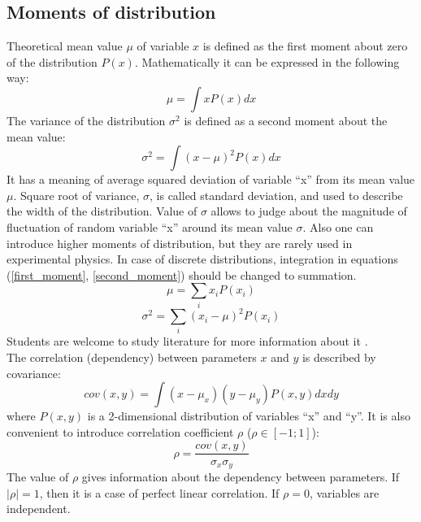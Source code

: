 \documentclass[12pt,a4paper]{report}
\begin{document}
\subsection{Moments of distribution}
Theoretical mean value $\mu$ of variable $x$ is defined as the first moment about zero of the distribution $P(x)$. Mathematically it can be expressed in the following way:
\begin{equation} \label{first_moment}
\mu = \int x P(x) dx
\end{equation}
The variance of the distribution $\sigma^2$ is defined as a second moment about the mean value:
\begin{equation} \label{second_moment}
\sigma^2 = \int (x-\mu)^2P(x)dx
\end{equation}
It has a meaning of average squared deviation of variable \enquote{x} from its mean value $\mu$. Square root of variance, $\sigma$, is called standard deviation, and used to describe the width of the distribution. Value of $\sigma$ allows to judge about the magnitude of fluctuation of random variable \enquote{x} around its mean value $\sigma$. Also one can introduce higher moments of distribution, but they are rarely used in experimental physics. In case of discrete distributions, integration in equations (\ref{first_moment}, \ref{second_moment}) should be changed to summation.
\begin{equation}
\mu = \sum_i x_i P(x_i)
\end{equation}
\begin{equation}
\sigma^2 = \sum_i (x_i-\mu)^2P(x_i)
\end{equation}
Students are welcome to study literature for more information about it \cite{stat_1, stat_2, stat_3}. \\
The correlation (dependency) between parameters $x$ and $y$ is described by covariance:
\begin{equation} \label{cov}
cov(x,y) = \int (x-\mu_x)(y-\mu_y)P(x,y)dxdy
\end{equation}
where $P(x,y)$ is a 2-dimensional distribution of variables \enquote{x} and \enquote{y}. It is also convenient to introduce correlation coefficient $\rho$ ($\rho \in [-1; 1]$):
\begin{equation} \label{rho}
\rho = \frac{cov(x,y)}{\sigma_x \sigma_y}
\end{equation}
The value of $\rho$ gives information about the dependency between parameters. If $|\rho| = 1$, then it is a case of perfect linear correlation. If $\rho = 0$, variables are independent.
\end{document}
